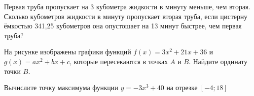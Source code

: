 \documentclass[twocolumn]{article}
\begin{document}
\begin{taskBN}{9}
Первая труба пропускает на 3 кубометра жидкости в минуту меньше, чем вторая. Сколько кубометров жидкости в минуту пропускает вторая труба, если цистерну ёмкостью 341,25 кубометров она опустошает на 13 минут быстрее, чем первая труба?

\end{taskBN}

\begin{taskBN}{10}
На рисунке изображены графики функций $f(x)=3x^{2}+21x+36$ и $g(x)=ax^{2} +bx+c$, которые пересекаются в точках $A$ и $B$. Найдите ординату точки $B$.\vspace{2.5cm}
\end{taskBN}

\begin{taskBN}{11}
Вычислите точку максимума функции $y = -3x^{3}+40$ на отрезке $\left[-4;18 \right]$
\end{taskBN}
\end{document}
